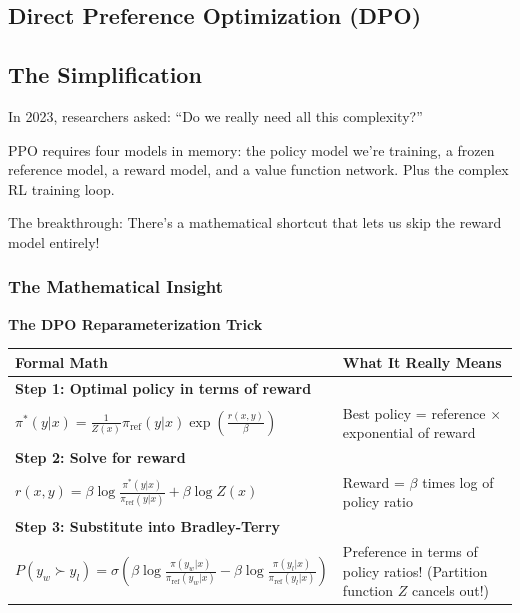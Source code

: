 \begin{chapterenv}

\chapter{Direct Preference Optimization (DPO)}

\section{The Simplification}

In 2023, researchers asked: ``Do we really need all this complexity?''

PPO requires four models in memory: the policy model we're training, a frozen reference model, a reward model, and a value function network. Plus the complex RL training loop.

The breakthrough: There's a mathematical shortcut that lets us skip the reward model entirely!

\subsection{The Mathematical Insight}

\begin{infobox}
\textbf{The DPO Reparameterization Trick}

\begin{center}
\begin{tabular}{p{}p{}}
\toprule
\textbf{Formal Math} & \textbf{What It Really Means} \\
\midrule
\multicolumn{2}{l}{\textbf{Step 1: Optimal policy in terms of reward}} \\
\midrule
$\pi^*(y|x) = \frac{1}{Z(x)} \pi_{\text{ref}}(y|x) \exp\!\left(\frac{r(x,y)}{\beta}\right)$ & Best policy = reference $\times$ exponential of reward \\
\midrule
\multicolumn{2}{l}{\textbf{Step 2: Solve for reward}} \\
\midrule
$r(x,y) = \beta \log \frac{\pi^*(y|x)}{\pi_{\text{ref}}(y|x)} + \beta \log Z(x)$ & Reward = $\beta$ times log of policy ratio \\
\midrule
\multicolumn{2}{l}{\textbf{Step 3: Substitute into Bradley-Terry}} \\
\midrule
$P(y_w \succ y_l) = \sigma\!\left(\beta \log \frac{\pi(y_w|x)}{\pi_{\text{ref}}(y_w|x)} - \beta \log \frac{\pi(y_l|x)}{\pi_{\text{ref}}(y_l|x)}\right)$ & Preference in terms of policy ratios! (Partition function $Z$ cancels out!) \\
\bottomrule
\end{tabular}
\end{center}
\end{infobox}


\end{chapterenv}
